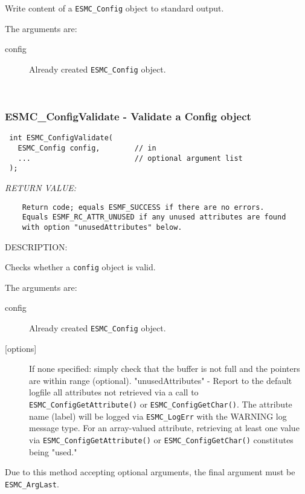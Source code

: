      Write content of a {\tt ESMC\_Config} object to standard output.
  
     The arguments are:
     \begin{description}
     \item [config]
       Already created {\tt ESMC\_Config} object.
     \end{description}
   
 
\mbox{}\hrulefill\ 
 
\subsubsection [ESMC\_ConfigValidate] {ESMC\_ConfigValidate - Validate a Config object}


  
\begin{verbatim} int ESMC_ConfigValidate(
   ESMC_Config config,        // in
   ...                        // optional argument list
 );\end{verbatim}{\em RETURN VALUE:}
\begin{verbatim}    Return code; equals ESMF_SUCCESS if there are no errors.
    Equals ESMF_RC_ATTR_UNUSED if any unused attributes are found
    with option "unusedAttributes" below.\end{verbatim}
{\sf DESCRIPTION:\\ }


     Checks whether a {\tt config} object is valid.
  
     The arguments are:
     \begin{description}
     \item [config]
       Already created {\tt ESMC\_Config} object.
     \item[{[options]}]
       If none specified:  simply check that the buffer is not full and the
         pointers are within range (optional).
       "unusedAttributes" - Report to the default logfile all attributes not
         retrieved via a call to {\tt ESMC\_ConfigGetAttribute()} or
         {\tt ESMC\_ConfigGetChar()}.  The attribute name (label) will be
         logged via {\tt ESMC\_LogErr} with the WARNING log message type.
         For an array-valued attribute, retrieving at least one value via
         {\tt ESMC\_ConfigGetAttribute()} or {\tt ESMC\_ConfigGetChar()}
         constitutes being "used."
     \end{description}
  
    Due to this method accepting optional arguments, the final argument
    must be {\tt ESMC\_ArgLast}.
  
\setlength{\parskip}{\oldparskip}
\setlength{\parindent}{\oldparindent}
\setlength{\baselineskip}{\oldbaselineskip}
